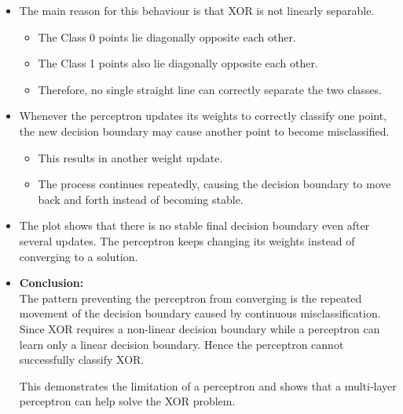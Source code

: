 \documentclass[11pt]{article}
\begin{document}
\begin{enumerate}
\begin{itemize}[itemsep=0.25cm]
    \item The main reason for this behaviour is that XOR is not linearly 
    separable.
    \begin{itemize}
        \item The Class 0 points lie diagonally opposite each other.
        \item The Class 1 points also lie diagonally opposite each other.
        \item Therefore, no single straight line can correctly separate the two classes.
    \end{itemize}

    \item Whenever the perceptron updates its weights to correctly classify one point, 
    the new decision boundary may cause another point to become misclassified.
    \begin{itemize}
        \item This results in another weight update.
        \item The process continues repeatedly, causing the decision boundary to 
        move back and forth instead of becoming stable.
    \end{itemize}

    \item The plot shows that there is no stable final decision boundary 
    even after several updates. The perceptron keeps changing its weights instead 
    of converging to a solution.

    \item \textbf{Conclusion:}\\
    The pattern preventing the perceptron from converging is 
    the repeated movement of the decision boundary caused by continuous 
    misclassification. Since XOR requires a non-linear decision boundary
    while a perceptron can learn only a linear decision boundary. Hence the perceptron 
    cannot successfully classify XOR.

    This demonstrates the limitation of a perceptron and shows that a multi-layer perceptron can help solve the XOR problem.


\end{itemize}
\end{enumerate}
\end{document}
